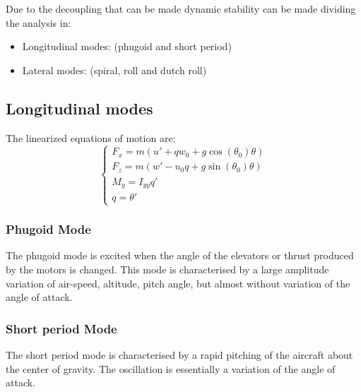 \documentclass[english,fira]{ist-report}
\begin{document}
Due to the decoupling that can be made dynamic stability can be made dividing the analysis in:
\begin{itemize}
	\item Longitudinal modes: (phugoid and short period)
	\item Lateral modes: (spiral, roll and dutch roll)
\end{itemize}

\subsection{Longitudinal modes}
The linearized equations of motion are:
\begin{equation}
   \begin{cases} F_x = m(u' + qw_0 + g\cos(\theta_0)\theta) \\ F_z = m(w' - u_0q + g\sin(\theta_0)\theta) \\  M_y = I_{yy}q' \\ q = \theta' \end{cases}
    \label{system of longitudinal equations } 
\end{equation}

\subsubsection{Phugoid Mode}
The phugoid mode is excited when the angle of the elevators or thrust produced by the motors is changed. This mode is characterised by a large amplitude variation of air-speed, altitude, pitch angle, but almost without variation of the angle of attack.

\subsubsection{Short period Mode}
The short period mode is characterised by a rapid pitching of the aircraft about the center of gravity. The oscillation is essentially a variation of the angle of attack.

\end{document}
